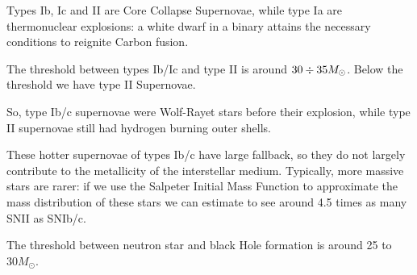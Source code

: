 \documentclass[main.tex]{subfiles}
\begin{document}
Types Ib, Ic and II are Core Collapse Supernovae, while type Ia are thermonuclear explosions: a white dwarf in a binary attains the necessary conditions to reignite Carbon fusion.

The threshold between types Ib/Ic and type II is around \(30 \divisionsymbol 35 M_{\odot}\). 
Below the threshold we have type II Supernovae.

So, type Ib/c supernovae were Wolf-Rayet stars before their explosion, while type II supernovae still had hydrogen burning outer shells.

These hotter supernovae of types Ib/c have large fallback, so they do not largely contribute to the metallicity of the interstellar medium.
Typically, more massive stars are rarer: if we use the Salpeter Initial Mass Function to approximate the mass distribution of these stars we can estimate to see around \num{4.5} times as many SNII as SNIb/c.

The threshold between neutron star and black Hole formation is around 25 to \(30M_{\odot}\).
\end{document}
